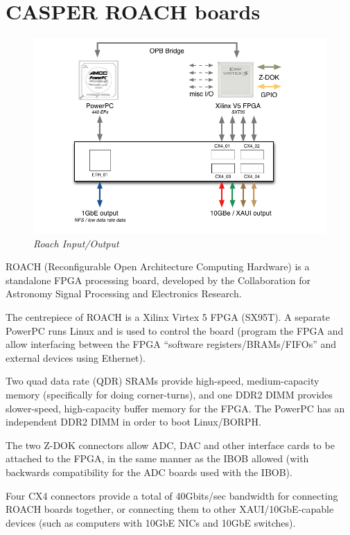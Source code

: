 \documentclass[letterpaper,10pt,english]{sphinxmanual}
\begin{document}
\section{CASPER ROACH boards}
\label{hardware:casper-roach-boards}\begin{figure}[htbp]
\centering
\capstart

\includegraphics{ROACH_IO.png}
\caption{\emph{Roach Input/Output}}\end{figure}

ROACH (Reconfigurable Open Architecture Computing Hardware) is a standalone
FPGA processing board, developed by the Collaboration for Astronomy Signal Processing
and Electronics Research.

The centrepiece of ROACH is a Xilinx Virtex 5 FPGA (SX95T).
A separate PowerPC runs Linux and is used to control the board (program the FPGA
and allow interfacing between the FPGA ``software registers/BRAMs/FIFOs'' and external
devices using Ethernet).

Two quad data rate (QDR) SRAMs provide high-speed, medium-capacity memory
(specifically for doing corner-turns), and one DDR2 DIMM provides slower-speed,
high-capacity buffer memory for the FPGA. The PowerPC has an independent DDR2 DIMM
in order to boot Linux/BORPH.

The two Z-DOK connectors allow ADC, DAC and other interface cards to be attached to the
FPGA, in the same manner as the IBOB allowed (with backwards compatibility for the ADC
boards used with the IBOB).

Four CX4 connectors provide a total of 40Gbits/sec bandwidth for connecting ROACH boards
together, or connecting them to other XAUI/10GbE-capable devices (such as
computers with 10GbE NICs and 10GbE switches).
\end{document}
